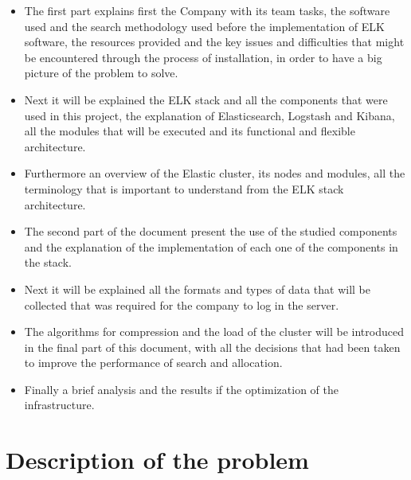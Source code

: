 \begin{itemize}
\item The first part explains first the Company with its team tasks, the software used and the search methodology used before the implementation of ELK software, the resources provided and the key issues and difficulties that might be encountered through the process of installation,  in order to have a big picture of the problem to solve.\\
\item Next it will be explained the ELK stack and all the components that were used in this project, the explanation of Elasticsearch, Logstash and Kibana, all the modules that will be executed and its functional and flexible architecture.\\ 
\item Furthermore an overview of the Elastic cluster, its nodes and modules, all the terminology that is important to understand from the ELK stack architecture.\\ 
\item The second part of the document present the use of the studied components and the explanation of the implementation of each one of the components in the stack.\\
\item Next it will be explained all the formats and types of data that will be collected that was required for the company to log in the server.\\
\item The algorithms for compression and the load of the cluster will be introduced in the final part of this document, with all the decisions that had been taken to improve the performance of search and allocation.
\item Finally a brief analysis and the results if the optimization of the infrastructure. 
\end{itemize} 

\chapter{Description of the problem}
